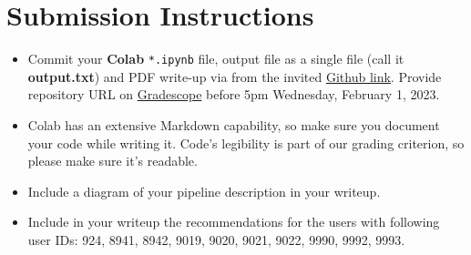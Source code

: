 \documentclass[paper=a4, fontsize=11pt]{scrartcl} %
\begin{document}
\section{Submission Instructions}

\begin{itemize}
    \item Commit your \textbf{Colab} \verb"*.ipynb" file, output file as a single file (call it \textbf{output.txt}) and PDF write-up via from the invited \href{https://classroom.github.com/a/Kog9MCRN}{Github link}. Provide repository URL on \href{https://www.gradescope.com/courses/494275}{Gradescope} before 5pm Wednesday, February 1, 2023.
    \item Colab has an extensive Markdown capability, so make sure you document your code while writing it. Code’s legibility is part of our grading criterion, so please make sure it’s readable.
    \item Include a diagram of your pipeline description in your writeup.
    \item Include in your writeup the recommendations for the users with following user IDs: 924, 8941, 8942, 9019, 9020, 9021, 9022, 9990, 9992, 9993.
\end{itemize}
\end{document}
